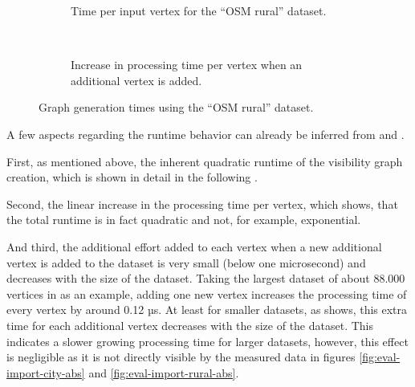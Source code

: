 \begin{figure}[h!]
\begin{minipage}{.48\textwidth}
\begin{subfigure}[t]{\linewidth}
\begin{figcenter}
							
						\end{figcenter}
						\caption{Time per input vertex for the \enquote{OSM rural} dataset.}
					\end{subfigure}
					\\[3ex]
					\begin{subfigure}[t]{\linewidth}
						\begin{figcenter}
							
						\end{figcenter}
						\caption{Increase in processing time per vertex when an additional vertex is added.}
						\label{fig:eval-import-rural-rel-increase}
					\end{subfigure}
					\caption{Graph generation times using the \enquote{OSM rural} dataset.}
					\label{fig:eval-import-rural}
				\end{minipage}
			\end{figure}
			
			A few aspects regarding the runtime behavior can already be inferred from  and .
			
			First, as mentioned above, the inherent quadratic runtime of the visibility graph creation, which is shown in detail in the following .
			
			Second, the linear increase in the processing time per vertex, which shows, that the total runtime is in fact quadratic and not, for example, exponential.
			
			And third, the additional effort added to each vertex when a new additional vertex is added to the dataset is very small (below one microsecond) and decreases with the size of the dataset.
			Taking the largest dataset of about 88.000 vertices in  as an example, adding one new vertex increases the processing time of every vertex by around 0.12 µs.
			At least for smaller datasets, as  shows, this extra time for each additional vertex decreases with the size of the dataset.
			This indicates a slower growing processing time for larger datasets, however, this effect is negligible as it is not directly visible by the measured data in figures \ref{fig:eval-import-city-abs} and \ref{fig:eval-import-rural-abs}.
			
